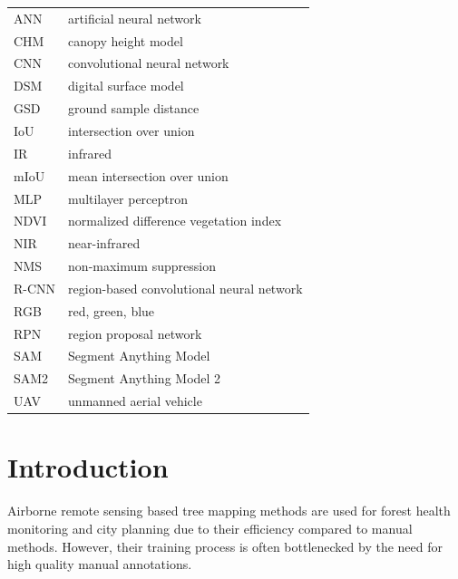 \documentclass[english, 12pt, a4paper, sci, utf8, a-2b, online]{aaltothesis}
\begin{document}
\dothesispagenumbering{}

\thesistableofcontents



\begin{tabular}{ll}
ANN & artificial neural network \\
CHM & canopy height model \\
CNN & convolutional neural network \\
DSM & digital surface model \\
GSD & ground sample distance \\
IoU & intersection over union \\
IR & infrared \\
mIoU & mean intersection over union \\
MLP & multilayer perceptron \\
NDVI & normalized difference vegetation index \\
NIR & near-infrared \\
NMS & non-maximum suppression \\
R-CNN & region-based convolutional neural network \\
RGB & red, green, blue \\
RPN & region proposal network \\
SAM & Segment Anything Model \\
SAM2 & Segment Anything Model 2 \\
UAV & unmanned aerial vehicle\\
\end{tabular}

\cleardoublepage

\section{Introduction}
\label{sec:intro}

\thispagestyle{empty}

Airborne remote sensing based tree mapping methods are used for forest health monitoring \cite{ecke} and city planning \cite{velasquez} due to their efficiency compared to manual methods. However, their training process is often bottlenecked by the need for high quality manual annotations. 
\end{document}
